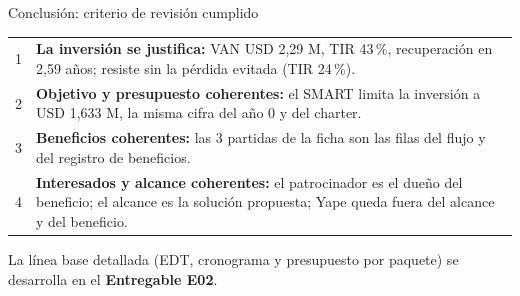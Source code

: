 \documentclass[aspectratio=169,11pt]{beamer}
\begin{document}
\begin{frame}{Conclusión: criterio de revisión cumplido}
\vspace{0.1cm}
\begin{center}
\small
\begin{tabular}{p{0.4cm}p{12.6cm}}
\toprule
1 & \textbf{La inversión se justifica:} VAN USD 2,29 M, TIR 43\,\%, recuperación en 2,59 años; resiste sin la pérdida evitada (TIR 24\,\%). \\[0.3em]
2 & \textbf{Objetivo y presupuesto coherentes:} el SMART limita la inversión a USD 1,633 M, la misma cifra del año 0 y del charter. \\[0.3em]
3 & \textbf{Beneficios coherentes:} las 3 partidas de la ficha son las filas del flujo y del registro de beneficios. \\[0.3em]
4 & \textbf{Interesados y alcance coherentes:} el patrocinador es el dueño del beneficio; el alcance es la solución propuesta; Yape queda fuera del alcance y del beneficio. \\
\bottomrule
\end{tabular}
\end{center}
\vspace{0.35cm}
\begin{center}
{\color{bcp} La línea base detallada (EDT, cronograma y presupuesto por paquete) se desarrolla en el \textbf{Entregable E02}.}
\end{center}
\end{frame}
\end{document}
